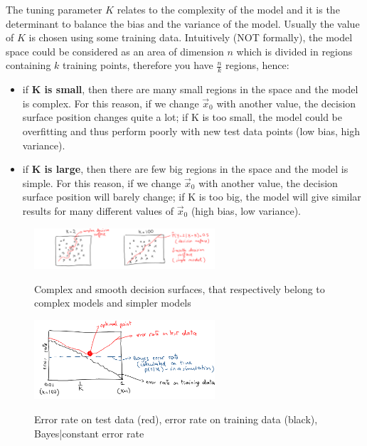       The tuning parameter $K$ relates to the complexity of the model and it is
      the determinant to balance the bias and the variance of the model. Usually
      the value of $K$ is chosen using some training data. Intuitively (NOT
      formally), the model space could be considered as an area of dimension $n$
      which is divided in regions containing $k$ training points, therefore you
      have $\frac{n}{k}$ regions, hence:
      \begin{itemize}
        \item if \textbf{K is small}, then there are many small regions in the
        space and the model is complex. For this reason, if we change
        $\vec{x}_0$ with another value, the decision surface position changes
        quite a lot; if K is too small, the model could be overfitting and thus
        perform poorly with new test data points (low bias, high variance).
        \item if \textbf{K is large}, then there are few big regions in the
        space and the model is simple. For this reason, if we change $\vec{x}_0$
        with another value, the decision surface position will barely change; if
        K is too big, the model will give similar results for many different
        values of $\vec{x}_0$ (high bias, low variance).
      \end{itemize}


\begin{figure}[ht]
\caption{Complex and smooth decision surfaces, that respectively belong to complex models and simpler models}
\centering
\includegraphics[width=0.6\textwidth]{KneighbourDecisionSurf}
\label{}
\end{figure}

\begin{figure}[ht]
\caption{Error rate on test data (red), error rate on training data (black), Bayes|constant error rate}
\centering
\includegraphics[width=0.6\textwidth]{KneighbourSimpleAgainstComplex}
\label{errorRate}
\end{figure}

